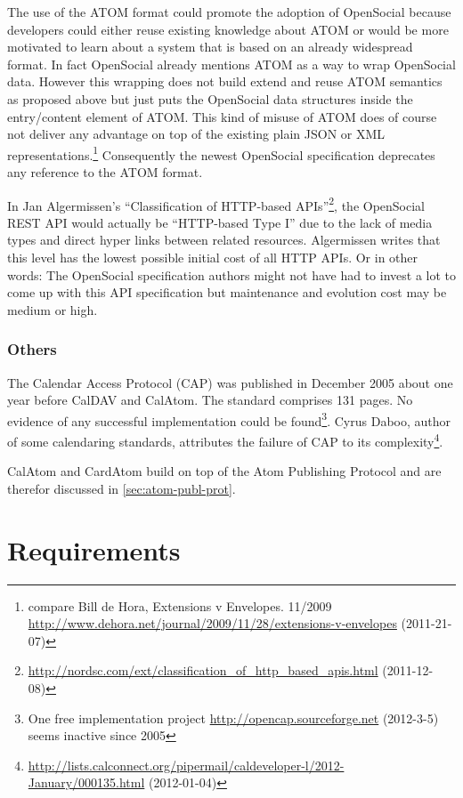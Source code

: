\documentclass[12pt,a4paper]{scrartcl}		%
\newcommand{\citeurl}[2]{\url{#1} (#2)}
\begin{document}
The use of the ATOM format could promote the adoption of OpenSocial because
developers could either reuse existing knowledge about ATOM or would be more
motivated to learn about a system that is based on an already widespread
format. In fact OpenSocial already mentions ATOM as a way to wrap OpenSocial
data. However this wrapping does not build extend and reuse ATOM semantics as
proposed above but just puts the OpenSocial data structures inside the
entry/content element of ATOM. This kind of misuse of ATOM does of course not
deliver any advantage on top of the existing plain JSON or XML
representations.\footnote{compare Bill de Hora, Extensions v Envelopes. 11/2009 
  \citeurl{http://www.dehora.net/journal/2009/11/28/extensions-v-envelopes}{2011-21-07}}
Consequently the newest OpenSocial specification deprecates any reference to the
ATOM format.

In Jan Algermissen's ``Classification of HTTP-based
APIs''\footnote{\citeurl{http://nordsc.com/ext/classification_of_http_based_apis.html}{2011-12-08}},
the OpenSocial REST API would actually be ``HTTP-based Type I'' due to the lack
of media types and direct hyper links between related resources. Algermissen
writes that this level has the lowest possible initial cost of all HTTP APIs. Or
in other words: The OpenSocial specification authors might not have had to
invest a lot to come up with this API specification but maintenance and
evolution cost may be medium or high.

\subsubsection{Others}

The Calendar Access Protocol (CAP)\cite{RFC4324} was published in December 2005
about one year before CalDAV and CalAtom. The standard comprises 131 pages. No
evidence of any successful implementation could be found\footnote{One free
  implementation project \citeurl{http://opencap.sourceforge.net}{2012-3-5}
  seems inactive since 2005}. Cyrus Daboo, author of some calendaring standards,
attributes the failure of CAP to its
complexity\footnote{\citeurl{http://lists.calconnect.org/pipermail/caldeveloper-l/2012-January/000135.html}{2012-01-04}}.

CalAtom and CardAtom build on top of the Atom Publishing Protocol and are
therefor discussed in \autoref{sec:atom-publ-prot}.

\section{Requirements}
\end{document}

